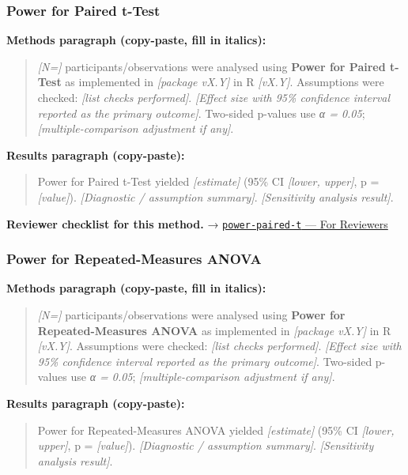 \documentclass[
]{article}
\begin{document}
\subsubsection{Power for Paired t-Test}\label{power-for-paired-t-test}

\textbf{Methods paragraph (copy-paste, fill in italics):}

\begin{quote}
\emph{{[}N={]}} participants/observations were analysed using
\textbf{Power for Paired t-Test} as implemented in \emph{{[}package
vX.Y{]}} in R \emph{{[}vX.Y{]}}. Assumptions were checked: \emph{{[}list
checks performed{]}}. \emph{{[}Effect size with 95\% confidence interval
reported as the primary outcome{]}}. Two-sided p-values use \emph{α =
0.05}; \emph{{[}multiple-comparison adjustment if any{]}}.
\end{quote}

\textbf{Results paragraph (copy-paste):}

\begin{quote}
Power for Paired t-Test yielded \emph{{[}estimate{]}} (95\% CI
\emph{{[}lower, upper{]}}, p = \emph{{[}value{]}}). \emph{{[}Diagnostic
/ assumption summary{]}}. \emph{{[}Sensitivity analysis result{]}}.
\end{quote}

\textbf{Reviewer checklist for this method.} →
\href{../chapters/05-power/power-paired-t.Rmd\#for-reviewers}{\texttt{power-paired-t}
--- For Reviewers}

\subsubsection{Power for Repeated-Measures
ANOVA}\label{power-for-repeated-measures-anova}

\textbf{Methods paragraph (copy-paste, fill in italics):}

\begin{quote}
\emph{{[}N={]}} participants/observations were analysed using
\textbf{Power for Repeated-Measures ANOVA} as implemented in
\emph{{[}package vX.Y{]}} in R \emph{{[}vX.Y{]}}. Assumptions were
checked: \emph{{[}list checks performed{]}}. \emph{{[}Effect size with
95\% confidence interval reported as the primary outcome{]}}. Two-sided
p-values use \emph{α = 0.05}; \emph{{[}multiple-comparison adjustment if
any{]}}.
\end{quote}

\textbf{Results paragraph (copy-paste):}

\begin{quote}
Power for Repeated-Measures ANOVA yielded \emph{{[}estimate{]}} (95\% CI
\emph{{[}lower, upper{]}}, p = \emph{{[}value{]}}). \emph{{[}Diagnostic
/ assumption summary{]}}. \emph{{[}Sensitivity analysis result{]}}.
\end{quote}
\end{document}
